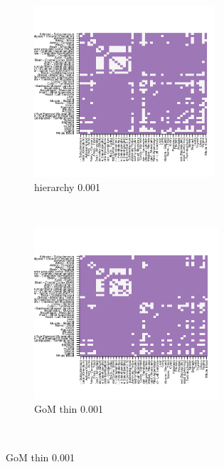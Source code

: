 \documentclass[10pt,letterpaper]{article}
\begin{document}
\begin{figure}[ht]
     \begin{subfigure}[t]{0.5\textwidth}
        \centering
        \includegraphics[height=2.5in]{../../plots/hierarchical_separation_thinned_0_001.png}
        \caption{hierarchy 0.001}
    \end{subfigure}%
    ~
    \begin{subfigure}[t]{0.5\textwidth}
        \centering
        \includegraphics[height=2.5in]{../../plots/admixture_separation_thinned_0_001.png}
        \caption{GoM thin 0.001}
    \end{subfigure}\\
\end{figure}
\end{document}
